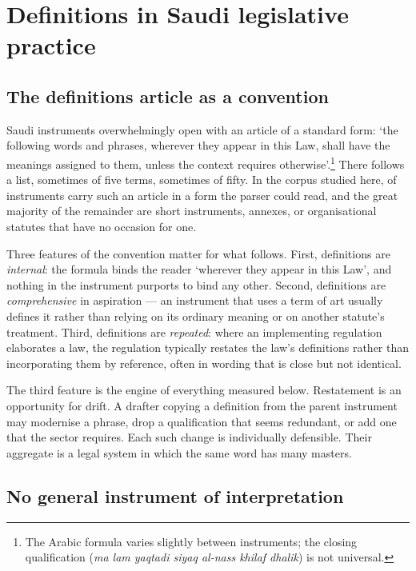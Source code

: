 \documentclass[11pt]{article}
\begin{document}
\section{Definitions in Saudi legislative practice}

\subsection{The definitions article as a convention}

Saudi instruments overwhelmingly open with an article of a standard form:
`the following words and phrases, wherever they appear in this Law, shall
have the meanings assigned to them, unless the context requires
otherwise'.\footnote{The Arabic formula varies slightly between instruments;
the closing qualification (\emph{ma lam yaqtadi siyaq al-nass khilaf dhalik})
is not universal.} There follows a list, sometimes of five terms, sometimes
of fifty. In the corpus studied here, \nWithDefsArticle{} of \nInstruments{}
instruments carry such an
article in a form the parser could read, and the great majority of the
remainder are short instruments, annexes, or organisational statutes that
have no occasion for one.

Three features of the convention matter for what follows. First, definitions
are \emph{internal}: the formula binds the reader `wherever they appear in
this Law', and nothing in the instrument purports to bind any other. Second,
definitions are \emph{comprehensive} in aspiration --- an instrument that
uses a term of art usually defines it rather than relying on its ordinary
meaning or on another statute's treatment. Third, definitions are
\emph{repeated}: where an implementing regulation elaborates a law, the
regulation typically restates the law's definitions rather than
incorporating them by reference, often in wording that is close but not
identical.

The third feature is the engine of everything measured below. Restatement is
an opportunity for drift. A drafter copying a definition from the parent
instrument may modernise a phrase, drop a qualification that seems
redundant, or add one that the sector requires. Each such change is
individually defensible. Their aggregate is a legal system in which the same
word has many masters.

\subsection{No general instrument of interpretation}
\end{document}
